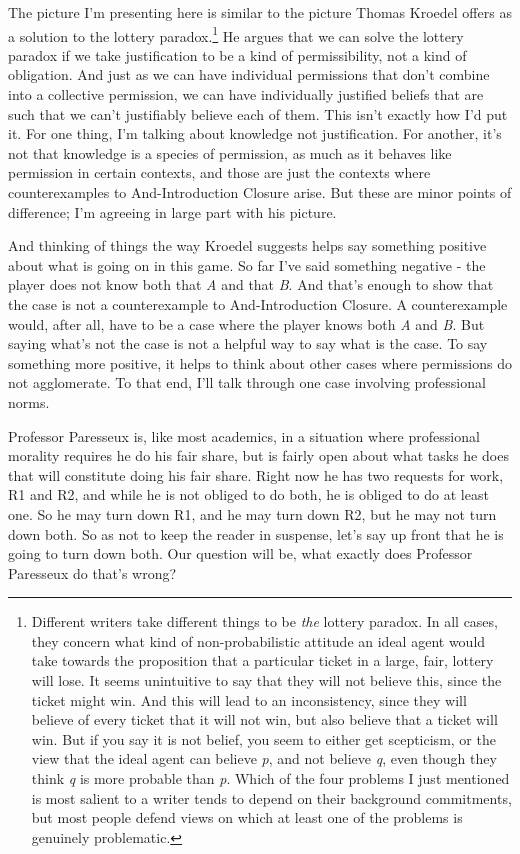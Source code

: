 \documentclass[
  11pt,
]{book}
\begin{document}
The picture I'm presenting here is similar to the picture Thomas Kroedel \citeyearpar{Kroedel2012} offers as a solution to the lottery paradox.\footnote{Different writers take different things to be \emph{the} lottery paradox. In all cases, they concern what kind of non-probabilistic attitude an ideal agent would take towards the proposition that a particular ticket in a large, fair, lottery will lose. It seems unintuitive to say that they will not believe this, since the ticket might win. And this will lead to an inconsistency, since they will believe of every ticket that it will not win, but also believe that a ticket will win. But if you say it is not belief, you seem to either get scepticism, or the view that the ideal agent can believe \emph{p}, and not believe \emph{q}, even though they think \emph{q} is more probable than \emph{p}. Which of the four problems I just mentioned is most salient to a writer tends to depend on their background commitments, but most people defend views on which at least one of the problems is genuinely problematic.} He argues that we can solve the lottery paradox if we take justification to be a kind of permissibility, not a kind of obligation. And just as we can have individual permissions that don't combine into a collective permission, we can have individually justified beliefs that are such that we can't justifiably believe each of them. This isn't exactly how I'd put it. For one thing, I'm talking about knowledge not justification. For another, it's not that knowledge is a species of permission, as much as it behaves like permission in certain contexts, and those are just the contexts where counterexamples to And-Introduction Closure arise. But these are minor points of difference; I'm agreeing in large part with his picture.

And thinking of things the way Kroedel suggests helps say something positive about what is going on in this game. So far I've said something negative - the player does not know both that \emph{A} and that \emph{B}. And that's enough to show that the case is not a counterexample to And-Introduction Closure. A counterexample would, after all, have to be a case where the player knows both \emph{A} and \emph{B}. But saying what's not the case is not a helpful way to say what is the case. To say something more positive, it helps to think about other cases where permissions do not agglomerate. To that end, I'll talk through one case involving professional norms.

Professor Paresseux is, like most academics, in a situation where professional morality requires he do his fair share, but is fairly open about what tasks he does that will constitute doing his fair share. Right now he has two requests for work, R1 and R2, and while he is not obliged to do both, he is obliged to do at least one. So he may turn down R1, and he may turn down R2, but he may not turn down both. So as not to keep the reader in suspense, let's say up front that he is going to turn down both. Our question will be, what exactly does Professor Paresseux do that's wrong?
\end{document}
